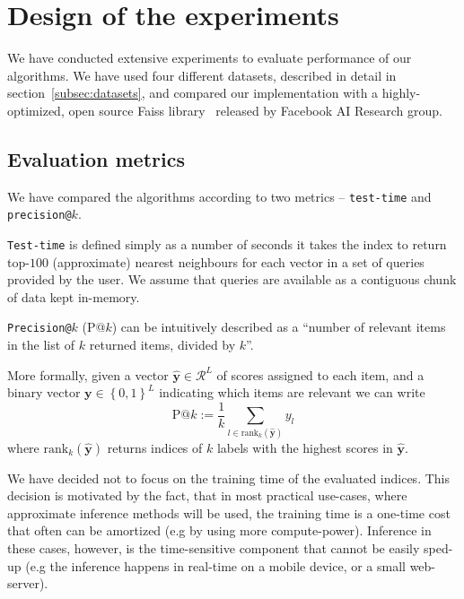 \section{Design of the experiments}\label{sec:experimentalDesign}

    We have conducted extensive experiments to evaluate performance of our algorithms. We have used
    four different datasets, described in detail in section~\ref{subsec:datasets}, and compared
    our implementation with a highly-optimized, open source Faiss library~\cite{faiss} released by
    Facebook AI Research group.

    \subsection{Evaluation metrics}\label{subsec:evaluationMetrics}

        We have compared the algorithms according to two metrics -- \texttt{test-time}
        and \texttt{precision@}$k$.

        \texttt{Test-time} is defined simply as a number of seconds it takes the index to return
        top-$100$ (approximate) nearest neighbours for each vector in a set of queries provided by the user.
        We assume that queries are available as a contiguous chunk of data kept in-memory.

        \texttt{Precision@}$k$ (P@$k$) can be intuitively described as a
        ``number of relevant items in the list of $k$ returned items, divided by $k$''.

        More formally, given a vector $\hat{\mathbf y} \in {\mathcal{R}}^{L}$ of scores assigned to each item, and a
        binary vector $\mathbf y \in \left\lbrace 0, 1 \right\rbrace^L$ indicating which items are relevant
        we can write
%
        \begin{equation*}
            \text{P}@k := \frac{1}{k} \sum_{l\in \text{rank}_k (\hat{\mathbf y})} y_l
        \end{equation*}
%
        where $\text{rank}_k(\hat {\mathbf y})$ returns indices of $k$ labels with the highest scores in $\hat{\mathbf y}$.

        We have decided not to focus on the training time of the evaluated indices. This
        decision is motivated by the fact, that in most practical use-cases, where
        approximate inference methods will be used, the training time is a one-time cost that
        often can be amortized (e.g by using more compute-power).
        Inference in these cases, however, is the time-sensitive component
        that cannot be easily sped-up (e.g the inference happens in real-time on a mobile device, or a small web-server).

